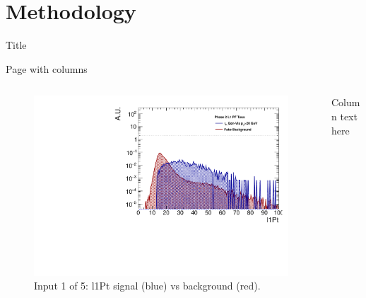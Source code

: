 \section{Methodology}

\begin{frame}{Title}
    \label{Title_label}\vspace{-0.5cm}\hspace{-2cm}
     
\end{frame}

\begin{frame}{Page with columns}
    
	\begin{columns}
	\begin{column}{0.5\textwidth}
	    \begin{figure}\vspace{-0.7cm}
            \includegraphics[width=1.0\textwidth]{figures/dyll_l1Pt.pdf}
            \caption{Input 1 of 5: l1Pt signal (blue) vs background (red).}
            
        \end{figure}
	\end{column}
	\begin{column}{0.5\textwidth}
        Column text here
    \end{column}
    \end{columns}
    
\end{frame}

